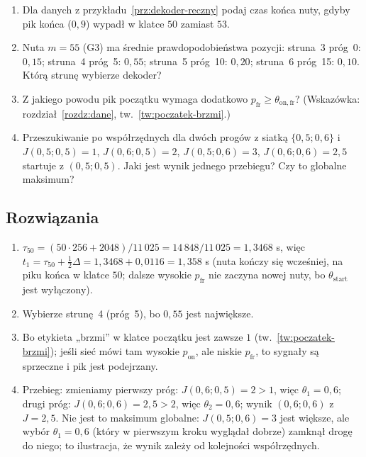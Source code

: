 \begin{sprawdz}
\begin{enumerate}
\item Dla danych z przykładu~\ref{prz:dekoder-reczny} podaj czas końca nuty, gdyby pik końca ($0{,}9$) wypadł w klatce $50$ zamiast $53$.
\item Nuta $m=55$ (G3) ma średnie prawdopodobieństwa pozycji: struna~3 próg~0: $0{,}15$; struna~4 próg~5: $0{,}55$; struna~5 próg~10: $0{,}20$; struna~6 próg~15: $0{,}10$. Którą strunę wybierze dekoder?
\item Z jakiego powodu pik początku wymaga dodatkowo $p_\mathrm{fr}\ge\theta_\mathrm{on,fr}$? (Wskazówka: rozdział~\ref{rozdz:dane}, tw.~\ref{tw:poczatek-brzmi}.)
\item Przeszukiwanie po współrzędnych dla dwóch progów z siatką $\{0{,}5;0{,}6\}$ i $J(0{,}5;0{,}5)=1$, $J(0{,}6;0{,}5)=2$, $J(0{,}5;0{,}6)=3$, $J(0{,}6;0{,}6)=2{,}5$ startuje z $(0{,}5;0{,}5)$. Jaki jest wynik jednego przebiegu? Czy to globalne maksimum?
\end{enumerate}
\end{sprawdz}

\subsection*{Rozwiązania}
\begin{enumerate}
\item $\tau_{50}=(50\cdot256+2048)/11\,025=14\,848/11\,025=1{,}3468$ s, więc $t_1=\tau_{50}+\tfrac12\Delta=1{,}3468+0{,}0116=1{,}358$ s (nuta kończy się wcześniej, na piku końca w klatce $50$; dalsze wysokie $p_\mathrm{fr}$ nie zaczyna nowej nuty, bo $\theta_\mathrm{start}$ jest wyłączony).
\item Wybierze strunę~4 (próg~5), bo $0{,}55$ jest największe.
\item Bo etykieta „brzmi” w klatce początku jest zawsze $1$ (tw.~\ref{tw:poczatek-brzmi}); jeśli sieć mówi tam wysokie $p_\mathrm{on}$, ale niskie $p_\mathrm{fr}$, to sygnały są sprzeczne i pik jest podejrzany.
\item Przebieg: zmieniamy pierwszy próg: $J(0{,}6;0{,}5)=2>1$, więc $\theta_1=0{,}6$; drugi próg: $J(0{,}6;0{,}6)=2{,}5>2$, więc $\theta_2=0{,}6$; wynik $(0{,}6;0{,}6)$ z $J=2{,}5$. Nie jest to maksimum globalne: $J(0{,}5;0{,}6)=3$ jest większe, ale wybór $\theta_1=0{,}6$ (który w pierwszym kroku wyglądał dobrze) zamknął drogę do niego; to ilustracja, że wynik zależy od kolejności współrzędnych.
\end{enumerate}
